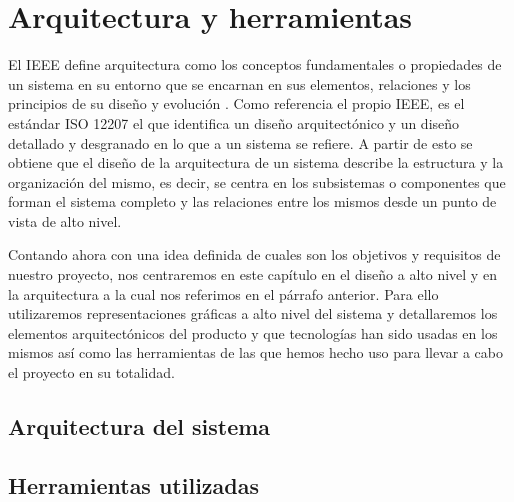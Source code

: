 \chapter{Arquitectura y herramientas}

El IEEE define arquitectura como los conceptos fundamentales o propiedades de un sistema en su entorno que se encarnan en sus elementos, relaciones y los principios de su diseño y evolución \cite{definiendo_arquitectura}.
Como referencia el propio IEEE, es el estándar ISO 12207 el que identifica un diseño arquitectónico y un diseño detallado y desgranado en lo que a un sistema se refiere. A partir de esto se obtiene que el diseño de la arquitectura de un sistema describe la estructura y la organización del mismo, es decir, se centra en los subsistemas o componentes que forman el sistema completo y las relaciones entre los mismos desde un punto de vista de alto nivel.

\bigskip

Contando ahora con una idea definida de cuales son los objetivos y requisitos de nuestro proyecto, nos centraremos en este capítulo en el diseño a alto nivel y en la arquitectura a la cual nos referimos en el párrafo anterior. Para ello utilizaremos representaciones gráficas a alto nivel del sistema y detallaremos los elementos arquitectónicos del producto y que tecnologías han sido usadas en los mismos así como las herramientas de las que hemos hecho uso para llevar a cabo el proyecto en su totalidad.

\section{Arquitectura del sistema}


\section{Herramientas utilizadas}

